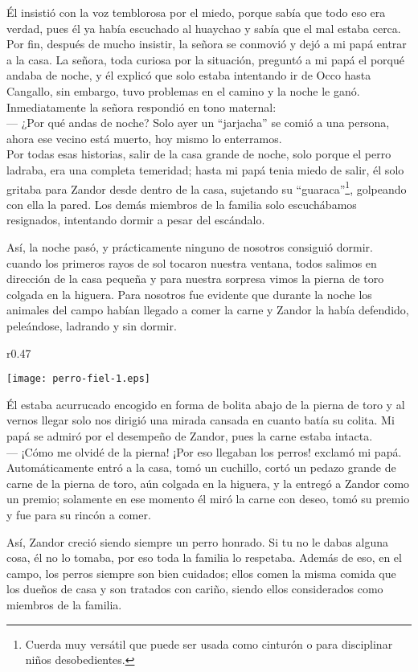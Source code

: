 Él insistió con la voz temblorosa por el miedo, porque sabía que todo eso era verdad, pues él ya había escuchado al huaychao y sabía que el mal estaba cerca. Por fin, después de mucho insistir, la señora se conmovió y dejó a mi papá entrar a la casa.
La señora, toda curiosa por la situación, preguntó a mi papá el porqué andaba de noche, y él explicó que solo estaba intentando ir de Occo hasta Cangallo, sin embargo, tuvo problemas en el camino y la noche le ganó. Inmediatamente la señora respondió en tono maternal:\\\indent 
--- ¿Por qué andas de noche? Solo ayer un ``jarjacha'' se comió a una persona, ahora ese vecino está muerto, hoy mismo lo enterramos.\\\indent
Por todas esas historias, salir de la casa grande de noche, solo porque el perro ladraba, era una completa temeridad; hasta mi papá tenia miedo de salir, él solo gritaba para Zandor desde dentro de la casa, sujetando su ``guaraca''\footnote{Cuerda muy versátil que puede ser usada como cinturón o para disciplinar niños desobedientes.}, golpeando con ella la pared.
Los demás miembros de la familia solo escuchábamos resignados, intentando dormir a pesar del escándalo.

Así, la noche pasó, y prácticamente ninguno de nosotros consiguió dormir. cuando los primeros rayos de sol tocaron nuestra ventana, todos salimos en dirección de la casa pequeña y para nuestra sorpresa vimos la pierna de toro colgada en la higuera. Para nosotros fue evidente que durante la noche los animales del campo habían llegado a comer la carne y Zandor la había defendido, peleándose, ladrando y sin dormir. 
\ifdefined\EnableIncludeImages
\begin{wrapfigure}{r}{0.47\textwidth}
  \begin{center}
  \vspace{-0.5cm}
    \texttt{[image: perro-fiel-1.eps]}
  \end{center}
  \vspace{-0.5cm}
\end{wrapfigure}
\fi
Él estaba acurrucado encogido en forma de bolita abajo de la pierna de toro y al vernos llegar solo nos dirigió una mirada cansada en cuanto batía su colita. Mi papá se admiró por el desempeño de Zandor, pues la carne estaba intacta.\\\indent
--- ¡Cómo me olvidé de la pierna! ¡Por eso llegaban los perros! exclamó mi papá.\\\indent
Automáticamente entró a la casa, tomó un cuchillo, cortó un pedazo grande de carne de la pierna de toro, aún colgada en la higuera, y la entregó a Zandor como un premio; solamente en ese momento él miró la carne con deseo, tomó su premio y fue para su rincón a comer.

Así, Zandor creció siendo siempre un perro honrado. Si tu no le dabas alguna cosa, él no lo tomaba, por eso toda la familia lo respetaba. Además de eso, en el campo, los perros siempre son bien cuidados; ellos comen la misma comida que los dueños de casa y son tratados con cariño, siendo ellos considerados como miembros de la familia.


